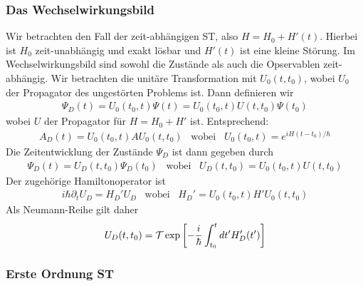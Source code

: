 \subsubsection{Das Wechselwirkungsbild}

Wir betrachten den Fall der zeit-abhängigen ST, also $H = H_0 + H'(t)$. Hierbei
ist $H_0$ zeit-unabhängig und exakt lösbar und $H'(t)$ ist eine kleine Störung.
Im Wechselwirkungsbild sind sowohl die Zustände als auch die Opservablen
zeit-abhängig. Wir betrachten die unitäre Transformation mit $U_0 (t,t_0)$,
wobei $U_0$ der Propagator des ungestörten Problems ist. Dann definieren wir
\begin{align*}
    \Psi_D (t) = U_0 (t_0,t) \Psi(t) = U_0 (t_0,t) U(t,t_0) \Psi(t_0)
\end{align*}
wobei $U$ der Propagator für $H = H_0 + H'$ ist. Entsprechend:
\begin{align*}
    A_D (t) = U_0(t_0,t) A U_0(t,t_0)
    \hspace{10pt} \text{wobei} \hspace{10pt}
    U_0 (t_0,t) = e^{i H (t-t_0) / \hbar}
\end{align*}
Die Zeitentwicklung der Zustände $\Psi_D$ ist dann gegeben durch
\begin{align*}
    \Psi_D (t) = U_D (t,t_0) \Psi_D (t_0)
    \hspace{10pt} \text{wobei} \hspace{10pt}
    U_D(t,t_0) = U_0 (t_0,t) U(t,t_0)
\end{align*}
Der zugehörige Hamiltonoperator ist
\begin{align*}
    i \hbar \partial_t U_D = H_D' U_D
    \hspace{10pt} \text{wobei} \hspace{10pt}
    H_D' = U_0(t_0,t) H' U_0(t,t_0)
\end{align*}
Als Neumann-Reihe gilt daher
\begin{align*}
    U_D (t,t_0) = \mathcal{T} \exp \left[ - \frac{i}{\hbar} \int_{t_0}^t dt' H_D'(t') \right]
\end{align*}

\subsubsection{Erste Ordnung ST}

